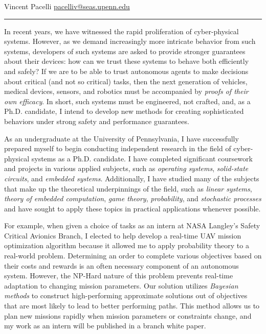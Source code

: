 \documentclass[]{letter}
\title{}
\author{}
\begin{document}
\newcommand{\comm}[1]{}

Vincent Pacelli \hfill \hfill \href{mailto:pacelliv@seas.upenn.edu}{pacelliv@seas.upenn.edu}\\
\rule{\textwidth}{0.1pt}

In recent years, we have witnessed the rapid proliferation of cyber-physical systems. However, as we demand increasingly more intricate behavior from such systems, developers of such systems are asked to provide stronger guarantees about their devices: how can we trust these systems to behave both efficiently and safely? If we are to be able to trust autonomous agents to make decisions about critical (and not so critical) tasks, then the next generation of vehicles, medical devices, sensors, and robotics must be accompanied by \emph{proofs of their own efficacy}. In short, such systems must be engineered, not crafted, and, as a Ph.D. candidate, I intend to develop new methods for creating sophisticated behaviors under strong safety and performance guarantees.

As an undergraduate at the University of Pennsylvania, I have successfully prepared myself to begin conducting independent research in the field of cyber-physical systems as a Ph.D. candidate. I have completed significant coursework and projects in various applied subjects, such as \emph{operating systems}, \emph{solid-state circuits}, and \emph{embedded systems}. Additionally, I have studied many of the subjects that make up the theoretical underpinnings of the field, such as \emph{linear systems}, \emph{theory of embedded computation}, \emph{game theory}, \emph{probability}, and \emph{stochastic processes} and have sought to apply these topics in practical applications whenever possible.

For example, when given a choice of tasks as an intern at NASA Langley's Safety Critical Avionics Branch, I elected to help develop a real-time UAV mission optimization algorithm because it allowed me to apply probability theory to a real-world problem. Determining an order to complete various objectives based on their costs and rewards is an often necessary component of an autonomous system. However, the NP-Hard nature of this problem prevents real-time adaptation to changing mission parameters. Our solution utilizes \emph{Bayesian methods} to construct high-performing approximate solutions out of objectives that are most likely to lead to better performing paths. This method allows us to plan new missions rapidly when mission parameters or constraints change, and my work as an intern will be published in a branch white paper.
\end{document}

